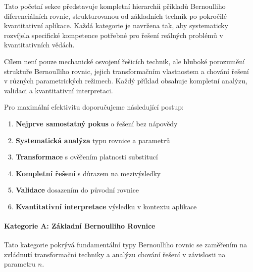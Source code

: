 \begin{intro}
Tato početní sekce představuje kompletní hierarchii příkladů Bernoulliho diferenciálních rovnic, strukturovanou od základních technik po pokročilé kvantitativní aplikace. Každá kategorie je navržena tak, aby systematicky rozvíjela specifické kompetence potřebné pro řešení reálných problémů v kvantitativních vědách.

Cílem není pouze mechanické osvojení řešicích technik, ale hluboké porozumění struktuře Bernoulliho rovnic, jejich transformačním vlastnostem a chování řešení v různých parametrických režimech. Každý příklad obsahuje kompletní analýzu, validaci a kvantitativní interpretaci.
\end{intro}

\vspace{0.8\baselineskip}

\begin{method}
\label{met:metodologie-priklady}
Pro maximální efektivitu doporučujeme následující postup:

\begin{enumerate}
\item \textbf{Nejprve samostatný pokus} o řešení bez nápovědy
\item \textbf{Systematická analýza} typu rovnice a parametrů
\item \textbf{Transformace} s ověřením platnosti substitucí
\item \textbf{Kompletní řešení} s důrazem na mezivýsledky
\item \textbf{Validace} dosazením do původní rovnice
\item \textbf{Kvantitativní interpretace} výsledku v kontextu aplikace
\end{enumerate}
\end{method}

\vspace{0.8\baselineskip}

\paragraph*{Kategorie A: Základní Bernoulliho Rovnice}
\label{par:l2-kategorie-a-zakladni}

Tato kategorie pokrývá fundamentální typy Bernoulliho rovnic se zaměřením na zvládnutí transformační techniky a analýzu chování řešení v závislosti na parametru $n$.

\vspace{0.6\baselineskip}


